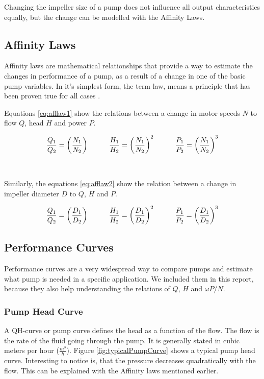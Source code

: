 Changing the impeller size of a pump does not influence all output characteristics equally,
but the change can be modelled with the Affinity Laws.

\subsection{Affinity Laws}\label{sub:afflaws}
Affinity laws are mathematical relationships that provide a way to estimate the 
changes in performance of a pump, as a result of a change in one of the basic pump variables.
In it's simplest form, the term law, means a principle that has been proven true for all cases \cite{Bachus2003}.

Equations \ref{eq:afflaw1} show the relations between a change in motor speeds $N$
to flow $Q$, head $H$ and power $P$.

\begin{equation}
	\frac{Q_1}{Q_2} = \left(\frac{N_1}{N_2}\right)
	\hspace{10mm}
	\frac{H_1}{H_2} = \left(\frac{N_1}{N_2}\right)^2
	\hspace{10mm}
	\frac{P_1}{P_2} = \left(\frac{N_1}{N_2}\right)^3
	\label{eq:afflaw1}
\end{equation}
\cite{Volk2014}\\\\
Similarly, the equations \ref{eq:afflaw2} show the relation between a change in impeller diameter $D$
to  $Q$, $H$ and $P$.

\begin{equation}
	\frac{Q_1}{Q_2} = \left(\frac{D_1}{D_2}\right)
	\hspace{10mm}
	\frac{H_1}{H_2} = \left(\frac{D_1}{D_2}\right)^2
	\hspace{10mm}
	\frac{P_1}{P_2} = \left(\frac{D_1}{D_2}\right)^3
	\label{eq:afflaw2}	
\end{equation}
\cite{Volk2014}

\subsection{Performance Curves}
Performance curves are a very widespread way to compare pumps
and estimate what pump is needed in a specific application.
We included them in this report,
because they also help understanding the relations of $Q$, $H$ and $\omega P$/$N$.

\subsubsection{Pump Head Curve}
A QH-curve or pump curve defines the head as a function of the flow. 
The flow is the rate of the fluid going through the pump.
It is generally stated in cubic meters per hour ($\frac{m^{3}}{h}$).
Figure \ref{fig:typicalPumpCurve} shows a typical pump head curve.
Interesting to notice is,
that the pressure decreases quadratically with the flow.
This can be explained with the Affinity laws mentioned earlier.

